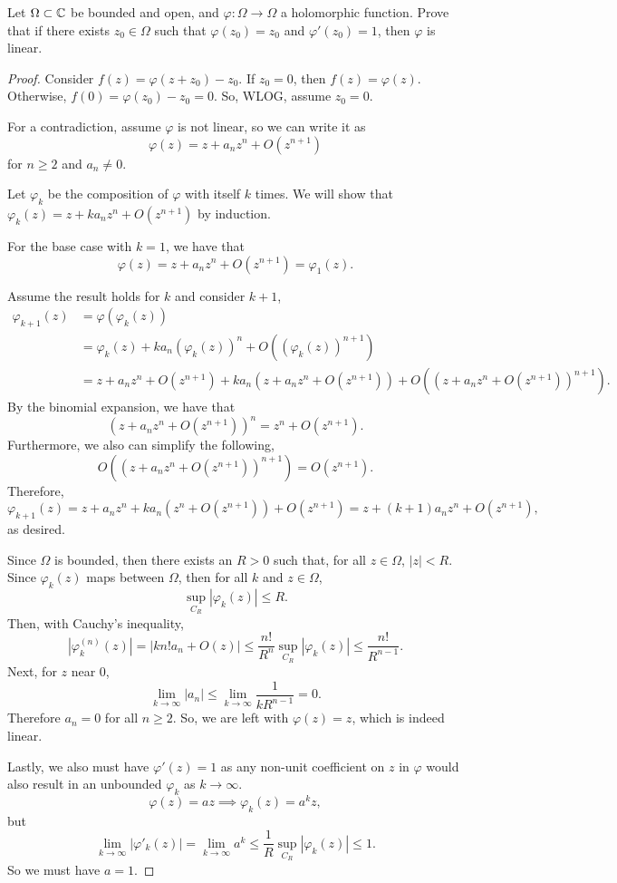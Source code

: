 \documentclass[../hw2]{subfiles}
\begin{document}
\begin{problem}
Let $\Omega \subset \mathbb{C}$ be bounded and open, and $\varphi:\Omega\to \Omega$ a holomorphic function.
Prove that if there exists $z_0\in \Omega$ such that $\varphi(z_0)=z_0$ and $\varphi'(z_0) = 1$, then $\varphi$ is linear.
\end{problem}
\begin{proof}
Consider $f(z)=\varphi(z+z_0)-z_0$. 
If $z_0=0$, then $f(z)=\varphi(z)$. 
Otherwise, $f(0)=\varphi(z_0)-z_0=0$. 
So, WLOG, assume $z_0=0$. 

For a contradiction, assume $\varphi$ is not linear, so we can write it as  \[
\varphi(z)=z+a_n z^n + O(z^{n+1})
\] for $n\ge 2$ and $a_n\neq 0$. 

Let $\varphi_k$ be the composition of $\varphi$ with itself $k$ times.
We will show that $\varphi_k(z)=z+k a_n z^n + O(z^{n+1})$ by induction. 

For the base case with $k=1$, we have that \[
\varphi(z)=z+ a_n z^n + O(z^{n+1})=\varphi_1(z)
.\] 

Assume the result holds for $k$ and consider $k+1$, 
 \begin{align*}
  \varphi_{k+1}(z) &= \varphi(\varphi_k(z)) \\
  &= \varphi_k(z) + k a_n (\varphi_k(z))^n + O((\varphi_k(z))^{n+1}) \\
  &= z+a_n z^n + O(z^{n+1}) + k a_n (z+ a_n z^n + O(z^{n+1})) + O((z+ a_n z^n + O(z^{n+1}))^{n+1})
.\end{align*}
By the binomial expansion, we have that \[
  (z+ a_n z^n + O(z^{n+1}))^n = z^n + O(z^{n+1})
.\] 
Furthermore, we also can simplify the following, \[
O((z+ a_n z^n + O(z^{n+1}))^{n+1})=O(z^{n+1})
.\] 
Therefore, \[
\varphi_{k+1}(z)=z+ a_n z^n + k a_n (z^n + O(z^{n+1})) + O(z^{n+1})
= z + (k+1) a_n z^n + O(z^{n+1})
,\] as desired.

Since $\Omega$ is bounded, then there exists an $R>0$ such that, for all $z\in \Omega$, $|z|<R$. 
Since $\varphi_k(z)$ maps between  $\Omega$, then for all $k$ and $z \in \Omega$,  \[
\sup_{C_R} |\varphi_k(z)|\le R
.\] 
Then, with Cauchy's inequality, \[
  |\varphi_k^{(n)}(z)| = | kn! a_n + O(z) | \le \frac{n!}{R^n}\sup_{C_R}{|\varphi_k(z)|}\le \frac{n!}{R^{n-1}}
.\] 
Next, for $z$ near 0, \[
\lim_{k \to \infty} |a_n| \le \lim_{k \to \infty} \frac{1}{k R^{n-1}} = 0
.\] 
Therefore $a_n=0$ for all  $n \ge 2$.  
So, we are left with $\varphi(z)=z$, which is indeed linear. 

Lastly, we also must have $\varphi'(z)=1$ as any non-unit coefficient on $z$ in $\varphi$ would also result in an unbounded $\varphi_k$ as $k\to \infty$. \[
\varphi(z)=az \implies \varphi_k(z)=a^k z
,\] but \[
\lim_{k \to \infty} |\varphi'_k(z)| = \lim_{k \to \infty} a^k \le \frac{1}{R} \sup_{C_R}|\varphi_k(z)| \le 1 
.\] 
So we must have $a=1$.
\end{proof}
\end{document}
